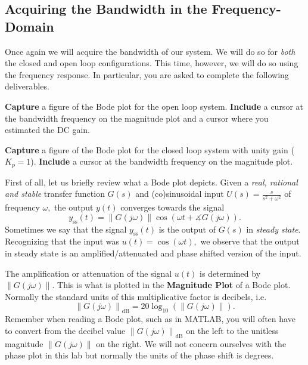 \subsection{Acquiring the Bandwidth in the Frequency-Domain}
Once again we will acquire the bandwidth of our system. We will do so for
\emph{both} the closed and open loop configurations. This time, however,
we will do so using the frequency response. In particular, you are asked
to complete the following deliverables.
%
\begin{deliverable}[label={lab2:d3a}]
  \textbf{Capture} a figure of the Bode plot for the open loop system.
  \textbf{Include} a cursor at the bandwidth frequency on the magnitude
  plot and a cursor where you estimated the DC gain.
\end{deliverable}
%
\begin{deliverable}[label={lab2:d3}]
  \textbf{Capture} a figure of the Bode plot for the closed loop system
  with unity gain (\(K_p = 1\)).
  \textbf{Include} a cursor at the bandwidth frequency on the magnitude
  plot.
\end{deliverable}
%
First of all, let us briefly review what a Bode plot depicts.
Given a \emph{real, rational and stable} transfer function \(G(s)\) and
(co)sinusoidal input
\(U(s) = \frac{s}{s^2 +\omega^2}\) of frequency \(\omega,\) the
output \(y(t)\) converges towards the signal
\[
  y_\mathrm{ss}(t)
    = \left\| G(j\omega) \right\| \cos(\omega t + \measuredangle G(j\omega)).
\]
Sometimes we say that the signal \(y_\mathrm{ss}(t)\) is the output of
\(G(s)\) in \emph{steady state}.
Recognizing that the input was \(u(t) = \cos(\omega t),\) we observe that the
output in steady state is an amplified/attenuated and phase shifted
version of the input.

The amplification or attenuation of the signal \(u(t)\) is determined by
\(\left\|G(j\omega)\right\|.\) This is what is plotted in the \textbf{
Magnitude Plot} of a Bode plot. Normally the standard units of this
multiplicative factor is decibels, i.e.
\[
\left\|G(j\omega)\right\|_{\mathrm{dB}} = 20 \log_{10}\left( \left\|G(j\omega)\right\| \right).
\]
Remember when reading a Bode plot, such as in MATLAB, you will often have to
convert from the decibel value \(\left\|G(j\omega)\right\|_{\mathrm{dB}}\) on
the left to the unitless magnitude \(\left\|G(j\omega)\right\|\) on the right.
We will not concern ourselves with the phase plot in this lab but normally
the units of the phase shift is degrees.

